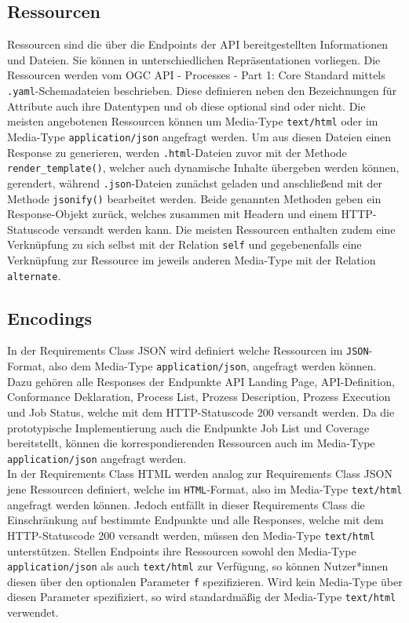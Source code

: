 \subsection{Ressourcen}
Ressourcen sind die über die Endpoints der API bereitgestellten Informationen und Dateien. Sie können in unterschiedlichen Repräsentationen vorliegen. 
Die Ressourcen werden vom OGC API - Processes - Part 1: Core Standard mittels \verb|.yaml|-Schemadateien beschrieben. 
Diese definieren neben den Bezeichnungen für Attribute auch ihre Datentypen und ob diese optional sind oder nicht. 
Die meisten angebotenen Ressourcen können um Media-Type \verb|text/html| oder im Media-Type \verb|application/json| angefragt werden. 
Um aus diesen Dateien einen Response zu generieren, werden \verb|.html|-Dateien zuvor mit der Methode \verb|render_template()|, welcher auch 
dynamische Inhalte übergeben werden können, gerendert, während \verb|.json|-Dateien zunächst geladen und anschließend 
mit der Methode \verb|jsonify()| bearbeitet werden. Beide genannten Methoden
geben ein Response-Objekt zurück, welches zusammen mit Headern und einem HTTP-Statuscode versandt werden kann.
Die meisten Ressourcen enthalten zudem eine Verknüpfung zu sich selbst mit der Relation \verb|self| und gegebenenfalls eine Verknüpfung 
zur Ressource im jeweils anderen Media-Type mit der Relation \verb|alternate|.

\subsection{Encodings}
In der Requirements Class JSON wird definiert welche Ressourcen im \verb|JSON|-Format, also dem Media-Type \verb|application/json|, 
angefragt werden können. Dazu gehören alle Responses der 
Endpunkte API Landing Page, API-Definition, Conformance Deklaration, Process List, Prozess Description, Prozess Execution und Job Status, welche mit dem 
HTTP-Statuscode 200 versandt werden. Da die prototypische Implementierung auch die Endpunkte Job List und Coverage bereitstellt, können die korrespondierenden
Ressourcen auch im Media-Type \verb|application/json| angefragt werden.\\

In der Requirements Class HTML werden analog zur Requirements Class JSON jene Ressourcen definiert, welche im \verb|HTML|-Format, also im Media-Type \verb|text/html| 
angefragt werden können. Jedoch entfällt in dieser Requirements Class die Einschränkung auf bestimmte Endpunkte und alle Responses, 
welche mit dem HTTP-Statuscode 200 versandt werden, müssen den Media-Type \verb|text/html| unterstützen.
Stellen Endpoints ihre Ressourcen sowohl den Media-Type \verb|application/json| als auch \verb|text/html| zur Verfügung, so können Nutzer*innen diesen über den optionalen Parameter
\verb|f| spezifizieren. Wird kein Media-Type über diesen Parameter spezifiziert, so wird standardmäßig der Media-Type \verb|text/html| verwendet.

